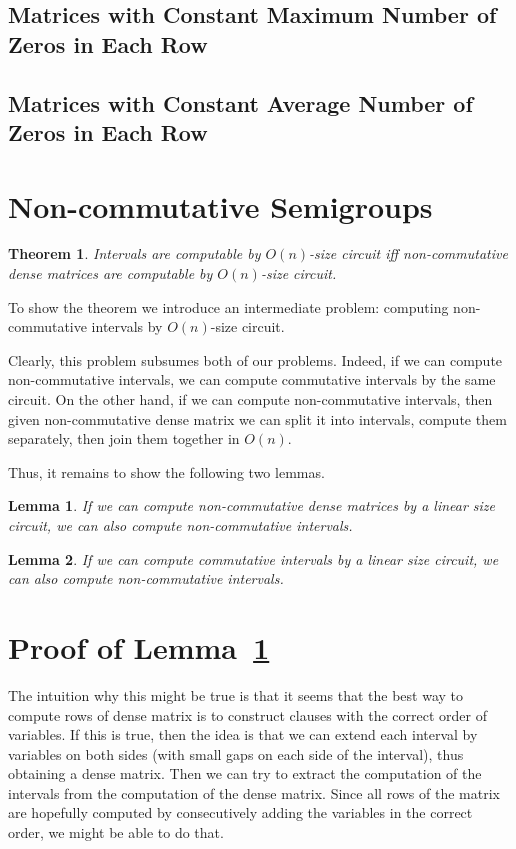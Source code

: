 \documentclass[11pt,letterpaper]{article}
\newtheorem{lemma}{Lemma}
\newtheorem{theorem}{Theorem}
\begin{document}
\subsection{Matrices with Constant Maximum Number of Zeros in Each Row}

\subsection{Matrices with Constant Average Number of Zeros in Each Row}

\section{Non-commutative Semigroups}

\begin{theorem}
Intervals are computable by $O(n)$-size circuit iff non-commutative dense matrices are computable by $O(n)$-size circuit.
\end{theorem}

To show the theorem we introduce an intermediate problem: computing non-commutative intervals by $O(n)$-size circuit.

Clearly, this problem subsumes both of our problems. Indeed, if we can compute non-commutative intervals, we can compute commutative intervals by the same circuit.
On the other hand, if we can compute non-commutative intervals, then given non-commutative dense matrix we can split it into intervals, compute them separately, then join them together in $O(n)$.

Thus, it remains to show the following two lemmas.

\begin{lemma} \label{lem:dense_matrices}
If we can compute non-commutative dense matrices by a linear size circuit, we can also compute non-commutative intervals.
\end{lemma}

\begin{lemma} \label{lem:intervals}
If we can compute commutative intervals by a linear size circuit, we can also compute non-commutative intervals.
\end{lemma}

\section{Proof of Lemma~\ref{lem:dense_matrices}}

The intuition why this might be true is that it seems that the best way to compute rows of dense matrix is to construct clauses with the correct order of variables. If this is true, then the idea is that we can extend each interval by variables on both sides (with small gaps on each side of the interval), thus obtaining a dense matrix. Then we can try to extract the computation of the intervals from the computation of the dense matrix. Since all rows of the matrix are hopefully computed by consecutively adding the variables in the correct order, we might be able to do that.
\end{document}
